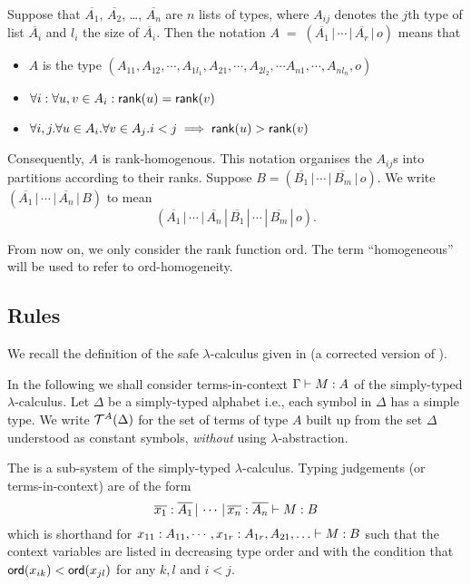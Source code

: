 Suppose that $\overline{A_1}$, $\overline{A_2}$, \ldots,
$\overline{A_n}$ are $n$ lists of types, where $A_{ij}$ denotes the
$j$th type of list $\overline{A_i}$ and $l_i$ the size of
$\overline{A_i}$. Then the notation $A \; = \; (\overline{A_1} \, |
\, \cdots \, | \, \overline{A_r} \, | \, o)$ means that
\begin{itemize}
  \item $A$ is the type $(A_{11},A_{12},\cdots, A_{1l_1}, A_{21}, \cdots,A_{2l_2}, \cdots A_{n1},\cdots, A_{nl_n},o)$
  \item $\forall i: \forall u,v \in A_i : {\sf rank}(u) = {\sf rank}(v) $
  \item $\forall i,j . \forall u \in A_i . \forall v \in A_j . i<j \implies {\sf rank}(u) >
   {\sf rank}(v) $
\end{itemize}
Consequently, $A$ is rank-homogenous. This notation organises the
$A_{ij}$s into partitions according to their ranks. Suppose $B =
(\overline{B_1} \, | \, \cdots \, | \, \overline{B_m} \, | \, o)$.
We write $(\overline{A_1} \, | \, \cdots \, | \, \overline{A_n} \, |
\, {B})$ to mean
\[(\overline{A_1} \, | \, \cdots \, | \, \overline{A_n} \, | \,
\overline{B_1} \, | \, \cdots \, | \, \overline{B_m} \, | \, o).\]

From now on, we only consider the rank function {\sf ord}. The term
``homogeneous'' will be used to refer to {\sf ord}-homogeneity.


\subsection{Rules}

We recall the definition of the safe $\lambda$-calculus given in
\cite{Ong2005} (a corrected version of
\cite{DBLP:conf/fossacs/AehligMO05}).


In the following we shall consider terms-in-context ${{\Gamma} \vdash {M
: A}}$ of the simply-typed $\lambda$-calculus. Let $\Delta$ be a
simply-typed alphabet i.e., each symbol in $\Delta$ has a simple
type. We write ${\cal T}^{A}(\Delta)$ for the set of terms of type $A$
built up from the set $\Delta$ understood as constant symbols,
\emph{without} using $\lambda$-abstraction.


The  is a sub-system of the
simply-typed $\lambda$-calculus. Typing judgements (or
terms-in-context) are of the form
\begin{equation}
\nonumber {{\overline{x_1}:\overline{A_1} \, | \, \cdots \, | \,
\overline{x_n} :  \overline{A_n}} \vdash {M : B}}
\end{equation}
which is shorthand for ${{x_{11} : A_{11}, \cdots, x_{1r}:
A_{1r}, A_{21},\ldots } \vdash {M : B}}$ such that the context variables are listed in decreasing type order and
 with the condition that ${\sf ord}(x_{ik}) < {\sf ord}(x_{jl})$ for any $k, l$ and $i<j$.

